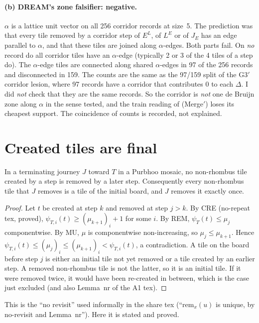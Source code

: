 \documentclass[11pt]{article}
\theoremstyle{definition}\newtheorem{definition}[theorem]{Definition}\newtheorem{remark}[theorem]{Remark}
\begin{document}
\paragraph{(b) DREAM's zone falsifier: negative.} $\alpha$ is a lattice unit vector on all 256 corridor records at size~5. The prediction was that every tile removed by a corridor step of $E^L$, of $L^E$ or of $J_E$ has an edge parallel to $\alpha$, and that these tiles are joined along $\alpha$-edges. Both parts fail. On \emph{no} record do all corridor tiles have an $\alpha$-edge (typically 2 or 3 of the 4 tiles of a step do). The $\alpha$-edge tiles are connected along shared $\alpha$-edges in 97 of the 256 records and disconnected in 159. The counts are the same as the 97/159 split of the G3$'$ corridor lesion, where 97 records have a corridor that contributes $0$ to each $\Delta$. I did \emph{not} check that they are the same records. So the corridor is \emph{not} one de Bruijn zone along $\alpha$ in the sense tested, and the train reading of (Merge$'$) loses its cheapest support. The coincidence of counts is recorded, not explained.

\section{Created tiles are final}\label{sec:fin}
\begin{lemma}[finality]\label{lem:fin}
In a terminating journey $J$ toward $T$ in a Purbhoo mosaic, no non-rhombus tile created by a step is removed by a later step. Consequently every non-rhombus tile that $J$ removes is a tile of the initial board, and $J$ removes it exactly once.
\end{lemma}
\begin{proof}
Let $t$ be created at step $k$ and removed at step $j>k$. By CRE (no-repeat tex, proved), $\psi_{T,i}(t)\ge(\mu_{k+1})_i+1$ for some $i$. By REM, $\psi_T(t)\le\mu_j$ componentwise. By MU, $\mu$ is componentwise non-increasing, so $\mu_j\le\mu_{k+1}$. Hence $\psi_{T,i}(t)\le(\mu_j)_i\le(\mu_{k+1})_i<\psi_{T,i}(t)$, a contradiction.
A tile on the board before step $j$ is either an initial tile not yet removed or a tile created by an earlier step. A removed non-rhombus tile is not the latter, so it is an initial tile. If it were removed twice, it would have been re-created in between, which is the case just excluded (and also Lemma~nr of the A1 tex).
\end{proof}
\noindent This is the ``no revisit'' used informally in the share tex (``$\mathrm{rem}_x(u)$ is unique, by no-revisit and Lemma~nr''). Here it is stated and proved.
\end{document}
